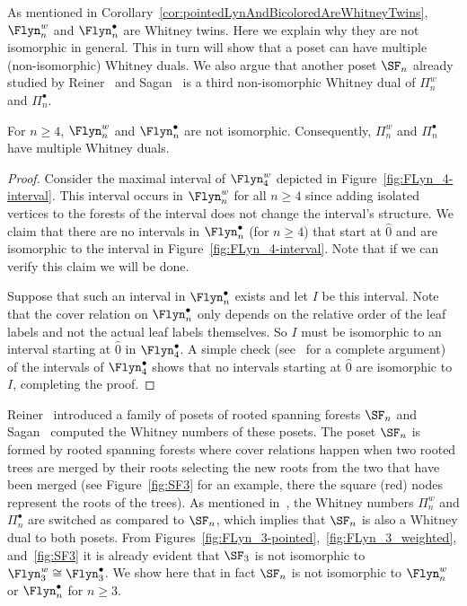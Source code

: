 As mentioned in Corollary~\ref{cor:pointedLynAndBicoloredAreWhitneyTwins}, $\Flyn_{n}^{w}$ and  $\Flyn_{n}^{\bullet}$ are Whitney twins.  Here we explain why they are not isomorphic in general.  This in turn will show that a poset can have multiple (non-isomorphic) Whitney duals. We also argue that another poset $\SF_n$ already studied by Reiner~\cite{Reiner1978} and Sagan~\cite{Sagan1983} is a third non-isomorphic Whitney dual of $\Pi_n^w$ and $\Pi_n^{\bullet}$.

\begin{theo}\label{thm:nonIsomorphicWDual}
  For $n\geq4$, $\Flyn_{n}^{w}$ and  $\Flyn_{n}^{\bullet}$ are not isomorphic. Consequently, $\Pi_n^w$ and $\Pi_n^\bullet$ have multiple Whitney duals.
\end{theo}
   \begin{proof}
   Consider the maximal interval of $\Flyn_{4}^{w}$ depicted in Figure~\ref{fig:FLyn_4-interval}. This interval occurs in $\Flyn_{n}^{w}$ for all $n\geq 4$ since adding isolated vertices to the forests of the interval does not change the interval's structure.  We claim that  there are no   intervals in $\Flyn_{n}^{\bullet}$ (for $n\geq 4$) that start at $\hat{0}$ and are isomorphic to the interval in Figure~\ref{fig:FLyn_4-interval}.  Note that if we can verify this claim we will be done.  
   
   Suppose that such an  interval in $\Flyn_{n}^{\bullet}$  exists and let $I$ be this interval. Note that the cover relation on $\Flyn_{n}^{\bullet}$ only depends on the relative order of the leaf labels and not the actual leaf labels themselves. So $I$ must be isomorphic to an interval starting at $\hat{0}$ in $\Flyn_{4}^{\bullet}$. A simple check (see~\cite[Theorem 3.3.4]{QuicenoDuran2020} for a complete argument) of the intervals of $\Flyn_{4}^{\bullet}$ shows that no intervals starting at $\hat{0}$ are isomorphic to $I$, completing the proof.
  \end{proof}
  
 Reiner~\cite{Reiner1978}  introduced a family of posets of rooted spanning forests $\SF_n$ and  Sagan~\cite{Sagan1983} computed the Whitney numbers of these posets. The poset  $\SF_n$  is formed by rooted spanning forests where cover relations happen when two rooted trees are merged by their roots selecting the new roots from the two that have been merged (see Figure~\ref{fig:SF3} for an example, there the square (red) nodes represent the roots of the trees). 
 As mentioned in~\cite{GonzalezDleonWachs2016}, the Whitney numbers $\Pi_n^w$ and $\Pi_n^{\bullet}$ are switched as compared to $\SF_n$, which implies that $\SF_n$ is also a Whitney dual to both posets.  From Figures~\ref{fig:FLyn_3-pointed},~\ref{fig:FLyn_3_weighted}, and~\ref{fig:SF3} it is already evident that $\SF_3$ is not isomorphic to $\Flyn_{3}^{w}\cong \Flyn_{3}^{\bullet}$. We show here that in fact $\SF_n$ is not isomorphic to $\Flyn_{n}^{w}$ or $\Flyn_{n}^{\bullet}$ for $n\ge 3$.  

